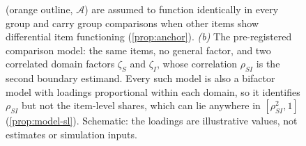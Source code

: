 \begin{figure}[t]
{(orange outline, $\mathcal{A}$) are assumed to function identically in every
group and carry group comparisons when other items show differential item
functioning (\cref{prop:anchor}). \emph{(b)} The pre-registered comparison
model: the same items, no general factor, and two correlated domain factors
$\zeta_S$ and $\zeta_I$, whose correlation $\rho_{SI}$ is the second boundary
estimand. Every such model is also a bifactor model with loadings
proportional within each domain, so it identifies $\rho_{SI}$ but not the
item-level shares, which can lie anywhere in $[\rho_{SI}^2,1]$
(\cref{prop:model-sl}). Schematic: the loadings are illustrative values, not
estimates or simulation inputs.}
\label{fig:bifactor}
\end{figure}
